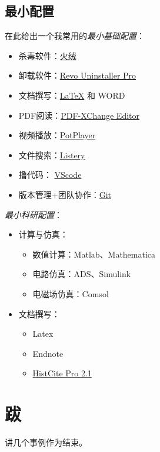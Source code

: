 \documentclass[UTF8,oneside]{ctexbook}
\begin{document}
\section{最小配置}
在此给出一个我常用的\emph{最小基础配置}：
\begin{itemize}
	\item 杀毒软件：\href{https://www.huorong.cn}{火绒}
	\item 卸载软件：\href{http://www.xue51.com/soft/11977.html}{Revo Uninstaller Pro}
	\item 文档撰写：\href{https://mirrors.tuna.tsinghua.edu.cn/CTAN/systems/texlive/Images/}{\LaTeX} 和 WORD
	\item PDF阅读：\href{https://www.tracker-software.com/product/pdf-xchange-editor}{PDF-XChange Editor}
	\item 视频播放：\href{http://potplayer.daum.net/?lang=zh_CN}{PotPlayer}
	\item 文件搜索：\href{https://www.listary.com}{Listery}
	\item 撸代码： \href{https://code.visualstudio.com}{VScode}
	\item 版本管理+团队协作：\href{https://git-scm.com}{Git}
\end{itemize}

\emph{最小科研配置}：
\begin{itemize}
	\item 计算与仿真：
	      \begin{itemize}
		      \item 数值计算：Matlab、Mathematica
		      \item 电路仿真：ADS、Simulink
		      \item 电磁场仿真：Comsol
	      \end{itemize}
	\item 文档撰写：
	      \begin{itemize}
		      \item Latex
		      \item Endnote
		      \item \href{https://zhuanlan.zhihu.com/p/20902898}{HistCite Pro 2.1}
	      \end{itemize}
\end{itemize}



\backmatter
\chapter*{跋}
讲几个事例作为结束。
\end{document}
